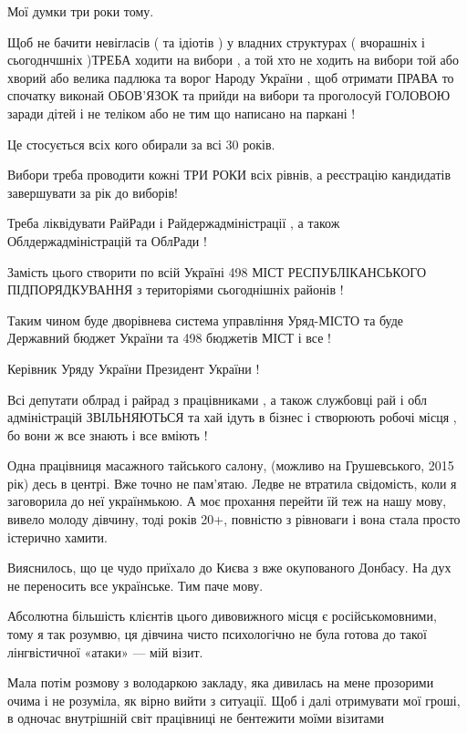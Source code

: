 \begin{itemize}
Мої думки три роки тому.

Щоб не бачити невігласів ( та ідіотів ) у владних структурах ( вчорашніх і
сьогоднчшніх )ТРЕБА ходити на вибори , а той хто не ходить на вибори той або
хворий або велика падлюка та ворог Народу України , щоб отримати ПРАВА то
спочатку виконай ОБОВ'ЯЗОК та прийди на вибори та проголосуй ГОЛОВОЮ заради
дітей і не теліком або не тим що написано на паркані !

Це стосується всіх кого обирали за всі 30 років.

Вибори треба проводити кожні ТРИ РОКИ всіх рівнів, а реєстрацію кандидатів
завершувати за рік до виборів!

Треба ліквідувати РайРади і Райдержадміністрації , а також Облдержадміністрацій
та ОблРади !

Замість цього створити по всій Україні 498 МІСТ РЕСПУБЛІКАНСЬКОГО
ПІДПОРЯДКУВАННЯ з територіями сьогоднішніх районів !

Таким чином буде дворівнева система управління Уряд-МІСТО та буде Державний
бюджет України та 498 бюджетів МІСТ і все !

Керівник Уряду України Президент України !

Всі депутати облрад і райрад з працівниками , а також службовці рай і обл
адміністрацій ЗВІЛЬНЯЮТЬСЯ та хай ідуть в бізнес і створюють робочі місця , бо
вони ж все знають і все вміють !


Одна працівниця масажного тайського салону, (можливо на Грушевського, 2015 рік)
десь в центрі. Вже точно не пам’ятаю. Ледве не втратила свідомість, коли я
заговорила до неї українмькою. А моє прохання перейти їй теж на нашу мову,
вивело молоду дівчину, тоді років 20+, повністю з рівноваги і вона стала просто
істерично хамити.

Вияснилось, що це чудо приїхало до Києва з вже окупованого Донбасу. На дух не
переносить все українське. Тим паче мову.

Абсолютна більшість клієнтів цього дивовижного місця є російськомовними, тому я
так розумвю, ця дівчина чисто психологічно не була готова до такої
лінгвістичної «атаки» — мій візит.

Мала потім розмову з володаркою закладу, яка дивилась на мене прозорими очима і
не розуміла, як вірно вийти з ситуації. Щоб і далі отримувати мої гроші, в
одночас внутрішній світ працівниці не бентежити моїми візитами \Laughey[1.0][white]


\end{itemize}
